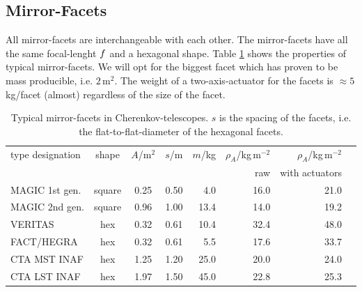 \documentclass[11pt,a4paper,oneside,titlepage]{article}
\begin{document}
\subsection{Mirror-Facets}
%
All mirror-facets are interchangeable with each other.
%
The mirror-facets have all the same focal-lenght $f$ and a hexagonal shape.
%
Table \ref{TabFacets} shows the properties of typical mirror-facets.
%
We will opt for the biggest facet which has proven to be mass producible, i.e. $2\,$m$^2$.
%
The weight of a two-axis-actuator for the facets is $\approx 5\,$kg/facet (almost) regardless of the size of the facet.
%
\begin{table}[H]
    \begin{center}
        \begin{tabular}{lccrrrrr}
            type designation & shape & $A$/m$^2$ & $s$/m & $m$/kg & $\rho_A$/kg\,m$^{-2}$ & $\rho_A$/kg\,m$^{-2}$\\
             & & & & & raw & with actuators\\
            \toprule
            MAGIC 1st gen. & square & 0.25 & 0.50  & 4.0 & 16.0 & 21.0\\
            MAGIC 2nd gen. & square & 0.96 & 1.00 & 13.4 & 14.0 & 19.2\\
            VERITAS        & hex    & 0.32 & 0.61 & 10.4 & 32.4 & 48.0\\
            FACT/HEGRA     & hex    & 0.32 & 0.61 & 5.5 & 17.6 & 33.7\\
            CTA MST INAF   & hex    & 1.25 & 1.20 & 25.0 & 20.0 & 24.0\\
            CTA LST INAF   & hex    & 1.97 & 1.50 & 45.0 & 22.8 & 25.3\\
            \bottomrule
        \end{tabular}
        \caption[]{Typical mirror-facets in Cherenkov-telescopes. $s$ is the spacing of the facets, i.e. the flat-to-flat-diameter of the hexagonal facets.}
        \label{TabFacets}
    \end{center}
\end{table}
%
\end{document}
